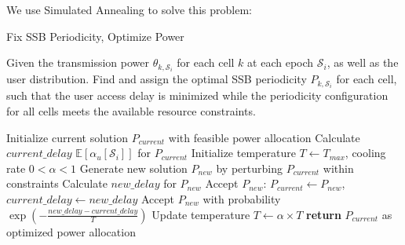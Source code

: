 We use Simulated Annealing to solve this problem:

\begin{algorithm}[H]
    \caption{Fix SSB Periodicity, Optimize Power}
    \label{alg:FSOP}
    \begin{algorithmic}[1]
        \REQUIRE{}
        Given the transmission power $\theta_{k,\mathcal{S}_i}$ for each cell $k$ at each epoch $\mathcal{S}_i$, as well as the user distribution.
        \ENSURE
        Find and assign the optimal SSB periodicity $P_{k, \mathcal{S}_i}$ for each cell, such that the user access delay is minimized while the periodicity configuration for all cells meets the available resource constraints.
        
        \STATE Initialize current solution $P_{current}$ with feasible power allocation
        \STATE Calculate $current\_delay$ $\mathbb{E}[\alpha_u[\mathcal{S}_i]]$ for $P_{current}$
        \STATE Initialize temperature $T \gets T_{max}$, cooling rate $0 < \alpha < 1$
            \STATE Generate new solution $P_{new}$ by perturbing $P_{current}$ within constraints
            \STATE Calculate $new\_delay$ for $P_{new}$
                \STATE Accept $P_{new}$: $P_{current} \gets P_{new}$, $current\_delay \gets new\_delay$
            \ELSE
                \STATE Accept $P_{new}$ with probability $\exp\left(-\frac{new\_delay - current\_delay}{T}\right)$
            \ENDIF
            \STATE Update temperature $T \gets \alpha \times T$
        \ENDWHILE
        \STATE \textbf{return} $P_{current}$ as optimized power allocation
    \end{algorithmic}
\end{algorithm}

